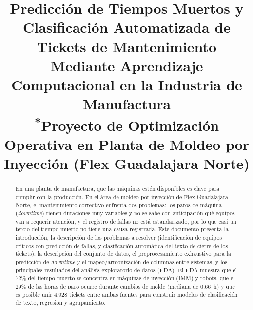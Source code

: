 \documentclass[conference]{IEEEtran}
\begin{document}
\title{Predicción de Tiempos Muertos y Clasificación Automatizada de Tickets de Mantenimiento Mediante Aprendizaje Computacional en la Industria de Manufactura\\
{\footnotesize \textsuperscript{*}Proyecto de Optimización Operativa en Planta de Moldeo por Inyección (Flex Guadalajara Norte)}}

\author{
\and
{}
\and
{}
}

\maketitle

\begin{abstract}
En una planta de manufactura, que las máquinas estén disponibles es clave para cumplir con la producción. En el área de moldeo por inyección de Flex Guadalajara Norte, el mantenimiento correctivo enfrenta dos problemas: los paros de máquina (\textit{downtime}) tienen duraciones muy variables y no se sabe con anticipación qué equipos van a requerir atención, y el registro de fallas no está estandarizado, por lo que casi un tercio del tiempo muerto no tiene una causa registrada. Este documento presenta la introducción, la descripción de los problemas a resolver (identificación de equipos críticos con predicción de fallas, y clasificación automática del texto de cierre de los tickets), la descripción del conjunto de datos, el preprocesamiento exhaustivo para la predicción de \textit{downtime} y el mapeo/armonización de columnas entre sistemas, y los principales resultados del análisis exploratorio de datos (EDA). El EDA muestra que el 72\% del tiempo muerto se concentra en máquinas de inyección (IMM) y robots, que el 29\% de las horas de paro ocurre durante cambios de molde (mediana de 0.66~h) y que es posible unir 4,928 tickets entre ambas fuentes para construir modelos de clasificación de texto, regresión y agrupamiento.
\end{abstract}
\end{document}
